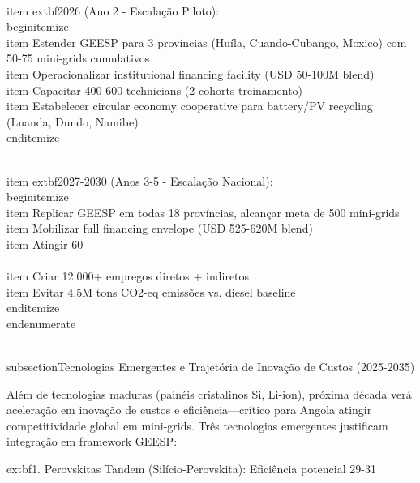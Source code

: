 \documentclass[12pt, a4paper]{article}
\begin{document}
{{{{{{{{{{{{\\item 	extbf{2026 (Ano 2 - Escalação Piloto)}:
  \\begin{itemize}
    \\item Estender GEESP para 3 províncias (Huíla, Cuando-Cubango, Moxico) com 50-75 mini-grids cumulativos
    \\item Operacionalizar institutional financing facility (USD 50-100M blend)
    \\item Capacitar 400-600 technicians (2 cohorts treinamento)
    \\item Estabelecer circular economy cooperative para battery/PV recycling (Luanda, Dundo, Namibe)
  \\end{itemize}

\\item 	extbf{2027-2030 (Anos 3-5 - Escalação Nacional)}:
  \\begin{itemize}
    \\item Replicar GEESP em todas 18 províncias, alcançar meta de 500 mini-grids
    \\item Mobilizar full financing envelope (USD 525-620M blend)
    \\item Atingir 60\\%
    \\item Criar 12.000+ empregos diretos + indiretos
    \\item Evitar 4.5M tons CO2-eq emissões vs. diesel baseline
  \\end{itemize}
\\end{enumerate}

\\subsection{Tecnologias Emergentes e Trajetória de Inovação de Custos (2025-2035)}

Além de tecnologias maduras (painéis cristalinos Si, Li-ion), próxima década verá aceleração em inovação de custos e eficiência—crítico para Angola atingir competitividade global em mini-grids. Três tecnologias emergentes justificam integração em framework GEESP:

	extbf{1. Perovskitas Tandem (Silício-Perovskita):}
Eficiência potencial 29-31\\%

}}}}}}}}}}}}
\end{document}
